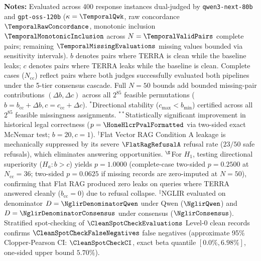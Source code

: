 \begin{table}[!t]
\raggedright \footnotesize \textbf{Notes:} Evaluated across 400 response instances dual-judged by \texttt{qwen3-\allowbreak{}next-\allowbreak{}80b} and \texttt{gpt-\allowbreak{}oss-\allowbreak{}120b} ($\kappa = \TemporalQwk$, raw concordance $\TemporalRawConcordance$, monotonic inclusion $\TemporalMonotonicInclusion$ across $N=\TemporalValidPairs$ complete pairs; remaining $\TemporalMissingEvaluations$ missing values bounded via sensitivity intervals). $b$ denotes pairs where TERRA is clean while the baseline leaks; $c$ denotes pairs where TERRA leaks while the baseline is clean. Complete cases ($N_{\text{cc}}$) reflect pairs where both judges successfully evaluated both pipelines under the 5-tier consensus cascade. Full $N=50$ bounds add bounded missing-pair contributions $(\Delta b, \Delta c)$ across all $2^{85}$ feasible permutations ($b = b_{\text{cc}} + \Delta b, c = c_{\text{cc}} + \Delta c$).
$^*$Directional stability ($c_{\max} < b_{\min}$) certified across all $2^{85}$ feasible missingness assignments.
$^{**}$Statistically significant improvement in historical legal correctness ($p = \HoneHlcrPvalFormatted$ via two-sided exact McNemar test; $b=20, c=1$).
$^\dagger$Flat Vector RAG Condition A leakage is mechanically suppressed by its severe $\FlatRagRefusalA$ refusal rate ($23/50$ safe refusals), which eliminates answering opportunities.
$^\S$For $H_1$, testing directional superiority ($H_a: b > c$) yields $p = 1.0000$ (complete-case two-sided $p = 0.2500$ at $N_{\text{cc}}=36$; two-sided $p = 0.0625$ if missing records are zero-imputed at $N=50$), confirming that Flat RAG produced zero leaks on queries where TERRA answered cleanly ($b_{\text{cc}}=0$) due to refusal collapse.
$^\ddagger$NGLIR evaluated on denominator $D=\NglirDenominatorQwen$ under Qwen ($\NglirQwen$) and $D=\NglirDenominatorConsensus$ under consensus ($\NglirConsensus$). Stratified spot-checking of $\CleanSpotCheckEvaluations$ Level-0 clean records confirms $\CleanSpotCheckFalseNegatives$ false negatives (approximate 95\% Clopper-Pearson CI: $\CleanSpotCheckCI$, exact beta quantile $[0.0\%, 6.98\%]$, one-sided upper bound $5.70\%$).
\end{table}
